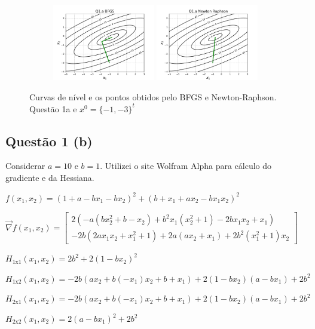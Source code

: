 \documentclass[10pt, a4paper]{article}
\begin{document}
\begin{figure}[H]
  \centering
  \begin{subfigure}[b]{\textwidth}
    \includegraphics[width=0.49\textwidth]{figuras/Q1.a_BFGS_P0=[-1 -3].pdf}
    \includegraphics[width=0.49\textwidth]{figuras/Q1.a_Newton Raphson_P0=[-1 -3].pdf}
  \end{subfigure}
  \caption{Curvas de nível e os pontos obtidos pelo BFGS e Newton-Raphson. Questão 1a e $x^0 = \{-1,-3\}^t$}
\end{figure}

\subsection{Questão 1 (b)}
Considerar $a = 10$ e $b = 1$. Utilizei o site Wolfram Alpha para cálculo do gradiente e da Hessiana.

\vspace{5mm}

\begin{center}
$f(x_1,x_2) = (1 + a -bx_1 - bx_2)^2 + (b + x_1 + ax_2 - bx_1x_2)^2$

\vspace{5mm}
$\overrightarrow{\nabla} f(x_1,x_2) = 
\begin{bmatrix}
  2(-a(bx_2^2 + b - x_2) + b^2x_1(x_2^2 + 1) -2bx_1x_2 + x_1) \\ -2b(2ax_1x_2 + x_1^2 + 1) + 2a(ax_2 + x_1) + 2b^2(x_1^2 +1)x_2
\end{bmatrix}$

\vspace{5mm}

$H_{1\text{x}1}(x_1,x_2) = 2b^2 + 2(1 - bx_2)^2$

$H_{1\text{x}2}(x_1,x_2) = -2b(ax_2 + b(-x_1)x_2 + b + x_1) + 2(1 - bx_2)(a - bx_1) + 2 b^2$

$H_{2\text{x}1}(x_1,x_2) = -2b(ax_2 + b(-x_1)x_2 + b + x_1) + 2(1 - bx_2) (a - bx_1) + 2 b^2$

$H_{2\text{x}2}(x_1,x_2) = 2(a - bx_1)^2 + 2b^2$

\end{center}
\end{document}
